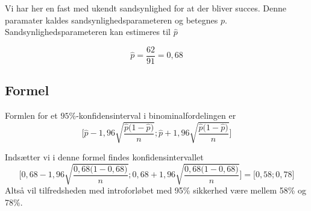 Vi har her en fast med ukendt sandsynlighed for at der bliver succes. Denne
paramater kaldes sandsynlighedsparameteren og betegnes \(p\).
Sandsynlighedsparameteren kan estimeres til \(\widehat{p}\)

\begin{equation}
  \widehat{p} = \frac{62}{91} = 0,68
\end{equation}

\subsection{Formel}
Formlen for et  \(95\%\)-konfidens\-interval i binominalfordelingen er
\begin{equation}
  \Bigg[ \widehat{p} - 1,96 \sqrt{\frac{\widehat{p}\big(1-\widehat{p}\big)}{n}} ;
  \widehat{p} + 1,96 \sqrt{\frac{\widehat{p}\big(1-\widehat{p}\big)}{n}} \Bigg]
\end{equation}

Indsætter vi i denne formel findes konfidensintervallet
\begin{equation}
  \Bigg[ 0,68 - 1,96 \sqrt{\frac{0,68\big(1-0,68\big)}{n}} ;
  0,68 + 1,96 \sqrt{\frac{0,68\big(1-0,68\big)}{n}} \Bigg] =
  \Big[0,58  ; 0,78  \Big]
\end{equation}
Altså vil tilfredsheden med introforløbet med 95\% sikkerhed være mellem 58\% og
78\%.
